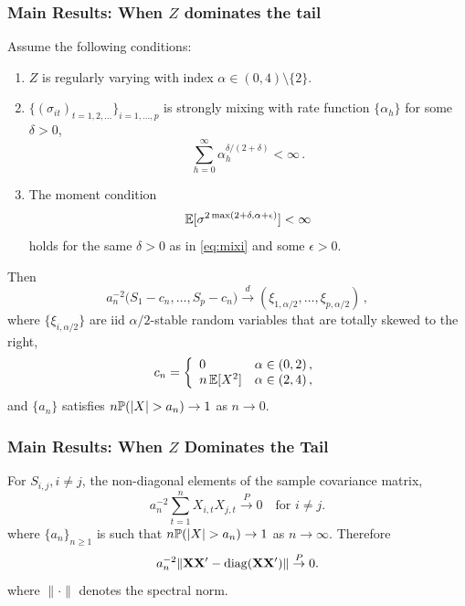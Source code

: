 \documentclass{beamer}
\begin{document}
\begin{frame}
  \frametitle{Main Results: When $Z$ dominates the tail}
  \begin{scriptsize}
    \begin{theorem}
      Assume the following conditions:
      \begin{enumerate}
      \item
        $Z$ is regularly varying with index $\alpha\in (0,4) \setminus \{2\}$.
      \item
        $\{(\sigma_{it})_{t=1,2,\ldots}\}_{i=1,\ldots,p}$  is strongly
        mixing with rate function $\{\alpha_h\}$ for some $\delta>0$,
        \begin{equation}
          \label{eq:mixi}
          \sum_{h=0}^\infty \alpha_h^{\delta/(2+\delta)}<\infty\,.        
        \end{equation}
      \item
        The moment condition
        \begin{equation}
          \label{eq:moment}
          \E[\sigma^{2\max(2+\delta,\alpha+\epsilon)} ]<\infty        
        \end{equation}
        holds for the same $\delta>0$ as in \eqref{eq:mixi} and some $\epsilon>0$. 
      \end{enumerate}
      Then 
      \begin{equation}
        \label{eq:feller}
        a_n^{-2}\big(S_{1}-c_n,\ldots,S_{p}-c_n\big) \overset{d}{\to} (\xi_{1,\alpha/2},\ldots,\xi_{p,\alpha/2})\,,      
      \end{equation}
      where $\{\xi_{i,\alpha/2}\}$ are iid $\alpha/2$-stable random
      variables that are totally skewed to the right,
      \begin{equation}
        \label{eq:6:anja}
        c_n=\left\{\begin{array}{ll}
            0& \alpha \in (0,2)\,,\\
            n \,\E[X^2] &\alpha\in (2,4)\,,
          \end{array}
        \right.
      \end{equation}
      and $\{a_n\}$ satisfies $n \P(|X|>a_n)\to 1$ as $n \to 0$.
    \end{theorem}
  \end{scriptsize}
\end{frame}

\begin{frame}
  \frametitle{Main Results: When $Z$ Dominates the Tail}
  For $S_{i,j}, i \neq j$, the non-diagonal elements of the sample covariance matrix,
  \[
  a_n^{-2} \sum_{t=1}^n X_{i,t} X_{j,t} \overset{P}{\to} 0
  \quad
  \text{for } i \neq j.
  \]
  where $\{a_n\}_{n\geq 1}$ is such that $n\P(|X| > a_n) \to 1$
  as $n \to \infty$. Therefore
  \begin{equation}
    a_n^{-2} \|\mtx{X X'} - \diag(\mtx{X X'}) \|
    \overset{P}{\to} 0.
  \end{equation}
  where $\|\cdot\|$ denotes the spectral norm.
\end{frame}
\end{document}
